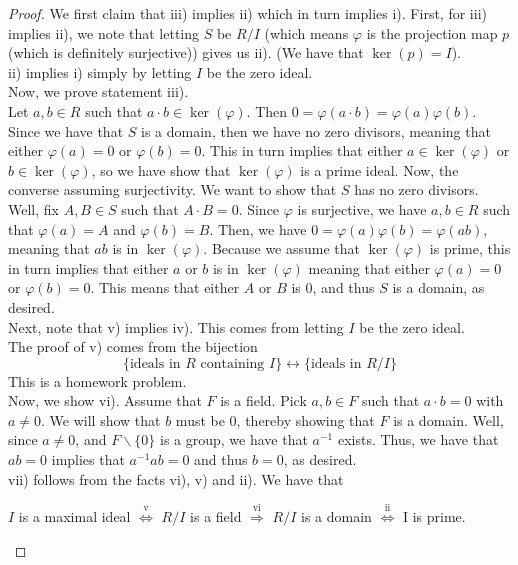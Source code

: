 \begin{proof}
    We first claim that iii) implies ii) which in turn implies i). First, for iii) implies
    ii), we note that letting $S$ be $R / I$ (which means $\varphi$ is the projection
    map $p$ (which is definitely surjective)) gives us ii). (We have that $\ker(p) = I$).\\
    ii) implies i) simply by letting $I$ be the zero ideal. \\
    Now, we prove statement iii). \\
    Let $a, b \in R$ such that $a \cdot b \in \ker(\varphi)$. Then $0 = \varphi(a \cdot b) = \varphi(a)\varphi(b)$.
    Since we have that $S$ is a domain, then we have no zero divisors, meaning that either
    $\varphi(a) = 0$ or $\varphi(b) = 0$. This in turn implies that either $a \in \ker(\varphi)$ or $b \in \ker(\varphi)$,
    so we have show that $\ker(\varphi)$ is a prime ideal. Now, the converse assuming surjectivity.
    We want to show that $S$ has no zero divisors. Well, fix $A,B \in S$ such that $A \cdot B = 0$.
    Since $\varphi$ is surjective, we have $a, b \in R$ such that $\varphi(a) = A$ and $\varphi(b) = B$.
    Then, we have $0 = \varphi(a)\varphi(b) = \varphi(ab)$, meaning that $ab$ is in $\ker(\varphi)$.
    Because we assume that $\ker(\varphi)$ is prime, this in turn implies that either
    $a$ or $b$ is in $\ker(\varphi)$ meaning that either $\varphi(a) = 0$ or $\varphi(b) = 0$.
    This means that either $A$ or $B$ is 0, and thus $S$ is a domain, as desired. \\
    Next, note that v) implies iv). This comes from letting $I$ be the zero ideal. \\
    The proof of v) comes from the bijection
    $$
    \{\textrm{ideals in $R$ containing $I$}\} \leftrightarrow \{\textrm{ideals in $R/I$}\}
    $$
    This is a homework problem. \\
    Now, we show vi). Assume that $F$ is a field. Pick $a,b \in F$ such that $a \cdot b = 0$
    with $a \neq 0$. We will show that $b$ must be 0, thereby showing that $F$ is a domain.
    Well, since $a \neq 0$, and $F \backslash \{0\}$ is a group, we have that $a^{-1}$ exists.
    Thus, we have that $ab = 0$ implies that $a^{-1}ab = 0$ and thus $b = 0$, as desired. \\
    vii) follows from the facts vi), v) and ii). We have that
    \begin{center}
        $I$ is a maximal ideal $\overset{\textrm{v}}{\iff}$ $R/I$ is a field $\overset{\textrm{vi}}{\Rightarrow}$ $R / I$ is a domain
        $\overset{\textrm{ii}}{\iff}$ I is prime.
    \end{center}
\end{proof}
